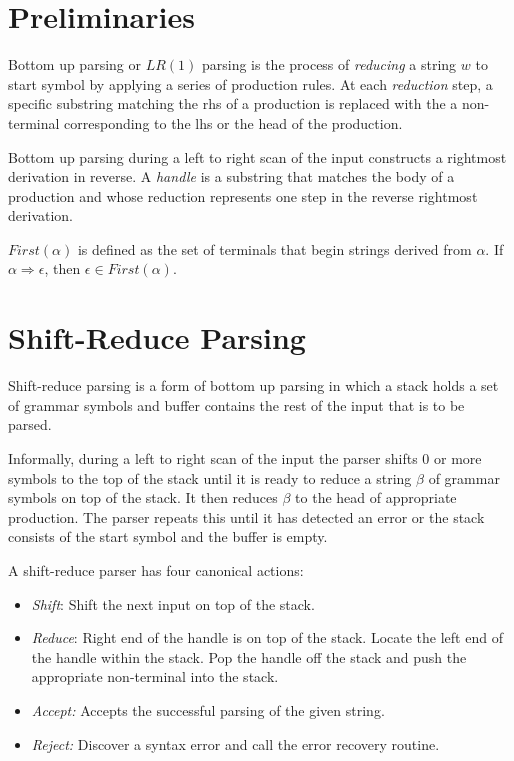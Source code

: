 \documentclass[oneside]{book}
\begin{document}
\section{Preliminaries}
Bottom up parsing or $LR(1)$ parsing is the process of \textit{reducing} a string $w$ to start symbol by applying a series of production rules. At each \textit{reduction} step, a specific substring matching the rhs of a production is replaced with the a non-terminal corresponding to the lhs or the head of the production.

Bottom up parsing during a left to right scan of the input constructs a rightmost derivation in reverse. A \textit{handle} is a substring that matches the body of a production and whose reduction represents one step in the reverse rightmost derivation.

$First(\alpha)$ is defined as the set of terminals that begin strings derived from $\alpha$. If $\alpha \Rightarrow \epsilon$, then $\epsilon \in First(\alpha)$.

\section{Shift-Reduce Parsing}
Shift-reduce parsing is a form of bottom up parsing in which a stack holds a set of grammar symbols and buffer contains the rest of the input that is to be parsed. 

Informally, during a left to right scan of the input the parser shifts 0 or more symbols to the top of the stack until it is ready to reduce a string $\beta$ of grammar symbols on top of the stack. It then reduces $\beta$ to the head of appropriate production. The parser repeats this until it has detected an error or the stack consists of the start symbol and the buffer is empty.

A shift-reduce parser has four canonical actions:

\begin{itemize}
\item \textit{Shift}: Shift the next input on top of the stack.
\item \textit{Reduce}: Right end of the handle is on top of the stack. Locate the left end of the handle within the stack. Pop the handle off the stack and push the appropriate non-terminal into the stack.
\item \textit{Accept:} Accepts the successful parsing of the given string.
\item \textit{Reject:} Discover a syntax error and call the error recovery routine.
\end{itemize}
\end{document}
